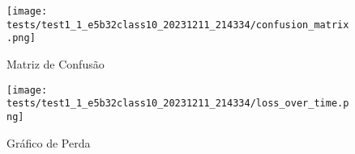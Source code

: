 \begin{figure}[ht]
 \begin{center}
   \texttt{[image: tests/test1\_1\_e5b32class10\_20231211\_214334/confusion\_matrix.png]}
  \caption{Matriz de Confusão}
  \label{fig:fig03}
 \end{center}
\end{figure}

\begin{figure}[ht]
 \begin{center}
   \texttt{[image: tests/test1\_1\_e5b32class10\_20231211\_214334/loss\_over\_time.png]}
  \caption{Gráfico de Perda}
  \label{fig:fig04}
 \end{center}
\end{figure}
